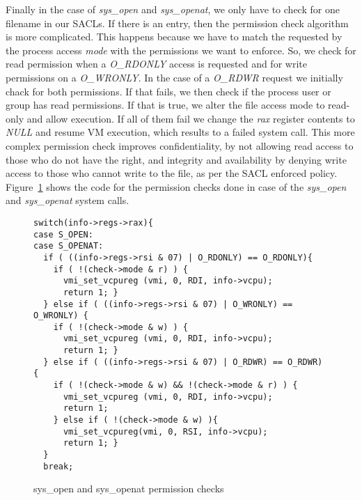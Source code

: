 \par Finally in the case of \textit{sys\_open} and \textit{sys\_openat}, we only have to check for one filename in our \ac{SACL}s. If there is an entry, then the permission check algorithm is more complicated. This happens because we have to match the requested by the process access \textit{mode} with the permissions we want to enforce. So, we check for read permission when a \textit{O\_RDONLY} access is requested and for write permissions on a \textit{O\_WRONLY}. In the case of a \textit{O\_RDWR} request we initially chack for both permissions. If that fails, we then check if the process user or group has read permissions. If that is true, we alter the file access mode to read-only and allow execution. If all of them fail we change the \textit{rax} register contents to \textit{NULL} and resume \ac{VM} execution, which results to a failed system call. This more complex permission check improves confidentiality, by not allowing read access to those who do not have the right, and integrity and availability by denying write access to those who cannot write to the file, as per the \ac{SACL} enforced policy. Figure~\ref{fig:open} shows the code for the permission checks done in case of the \textit{sys\_open} and \textit{sys\_openat} system calls.

\begin{figure}[ht]
	\centering
	\begin{lstlisting}[basicstyle=\footnotesize]
switch(info->regs->rax){
case S_OPEN:
case S_OPENAT:
  if ( ((info->regs->rsi & 07) | O_RDONLY) == O_RDONLY){
    if ( !(check->mode & r) ) {
      vmi_set_vcpureg (vmi, 0, RDI, info->vcpu);
      return 1; }
  } else if ( ((info->regs->rsi & 07) | O_WRONLY) == O_WRONLY) {
    if ( !(check->mode & w) ) {
      vmi_set_vcpureg (vmi, 0, RDI, info->vcpu);
      return 1; }
  } else if ( ((info->regs->rsi & 07) | O_RDWR) == O_RDWR) {
    if ( !(check->mode & w) && !(check->mode & r) ) {
      vmi_set_vcpureg (vmi, 0, RDI, info->vcpu);
      return 1;
    } else if ( !(check->mode & w) ){
      vmi_set_vcpureg(vmi, 0, RSI, info->vcpu);
      return 1; }
  }
  break;
	\end{lstlisting}
	\caption{sys\_open and sys\_openat permission checks}
	\label{fig:open}
\end{figure}


